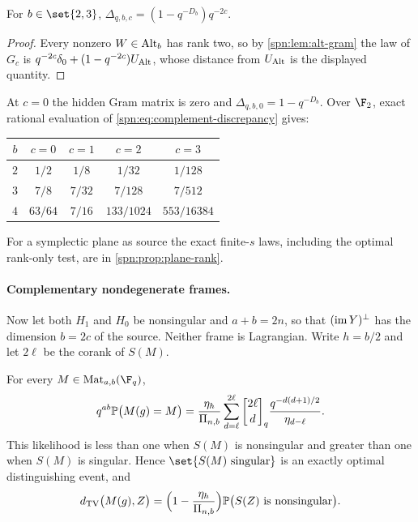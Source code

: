 \begin{corollary}\label{spn:cor:small-source}
For $b\in\set{2,3}$, $\Delta_{q,b,c}=(1-q^{-D_b})q^{-2c}$.
\end{corollary}

\begin{proof}
Every nonzero $W\in\operatorname{Alt}_b$ has rank two, so by \cref{spn:lem:alt-gram} the law of $G_c$ is
$q^{-2c}\delta_0+(1-q^{-2c})U_{\operatorname{Alt}}$, whose distance from $U_{\operatorname{Alt}}$ is the displayed
quantity.
\end{proof}

At $c=0$ the hidden Gram matrix is zero and $\Delta_{q,b,0}=1-q^{-D_b}$. Over $\F_2$, exact
rational evaluation of \eqref{spn:eq:complement-discrepancy} gives:
\begin{center}\small
\begin{tabular}{ccccc}
\toprule
$b$ & $c=0$ & $c=1$ & $c=2$ & $c=3$\\
\midrule
$2$ & $1/2$ & $1/8$ & $1/32$ & $1/128$\\
$3$ & $7/8$ & $7/32$ & $7/128$ & $7/512$\\
$4$ & $63/64$ & $7/16$ & $133/1024$ & $553/16384$\\
\bottomrule
\end{tabular}
\end{center}
For a symplectic plane as source the exact finite-$s$ laws, including the optimal rank-only
test, are in \cref{spn:prop:plane-rank}.

\paragraph{Complementary nondegenerate frames.}
Now let both $H_1$ and $H_0$ be nonsingular and $a+b=2n$, so that $(\operatorname{im} Y)^\perp$ has the
dimension $b=2c$ of the source. Neither frame is Lagrangian. Write $h=b/2$ and let $2\ell$ be the
corank of $S(M)$.

\begin{theorem}\label{spn:thm:balanced}
For every $M\in\spnMat_{a,b}(\F_q)$,
\[
 q^{ab}\spnP\bigl(M(g)=M\bigr)=\frac{\eta_h}{\Pi_{n,b}}
 \sum_{d=\ell}^{2\ell}\spnqbin{2\ell}{d}{q}\frac{q^{-d(d+1)/2}}{\eta_{d-\ell}} .
\]
This likelihood is less than one when $S(M)$ is nonsingular and greater than one when $S(M)$ is
singular. Hence $\set{S(M)\text{ singular}}$ is an exactly optimal distinguishing event, and
\[
 d_{\mathrm{TV}}\bigl(M(g),Z\bigr)=\Bigl(1-\frac{\eta_h}{\Pi_{n,b}}\Bigr)
 \mathbb{P}\bigl(S(Z)\text{ is nonsingular}\bigr).
\]
\end{theorem}


